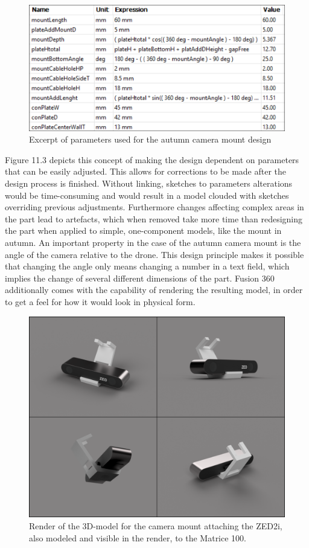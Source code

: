 \begin{figure}[h]
	\centering
	\includegraphics[width=0.7\linewidth]{img/Parameter}
	\caption{Excerpt of parameters used for the autumn camera mount design}
	\label{fig:custom_parts_parameter}
\end{figure}

Figure 11.3 depicts this concept of making the design dependent on parameters that can be easily adjusted. This allows for corrections to be made after the design process is finished. Without linking, sketches to parameters alterations would be time-consuming and would result in a model clouded with sketches overriding previous adjustments. Furthermore changes affecting complex areas in the part lead to artefacts, which when removed take more time than redesigning the part when applied to simple, one-component models, like the mount in autumn. An important property in the case of the autumn camera mount is the angle of the camera relative to the drone. This design principle makes it possible that changing the angle only means changing a number in a text field, which implies the change of several different dimensions of the part. 
Fusion 360 additionally comes with the capability of rendering the resulting model, in order to get a feel for how it would look in physical form.

\begin{figure}[h]
	\centering
	\includegraphics[width=0.6\linewidth]{img/MountRender}
	\caption{Render of the 3D-model for the camera mount attaching the ZED2i, also modeled and visible in the render, to the Matrice 100.}
	\label{fig:custom_parts_mountRender}
\end{figure}

